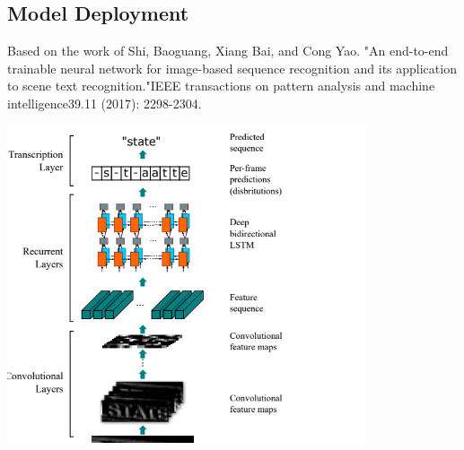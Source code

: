 \documentclass[14pt]{extarticle}
\newcommand{\<}{\langle}
\renewcommand{\>}{\rangle}
\theoremstyle{definition}
\begin{document}
\subsection{Model Deployment}
Based on the work of Shi, Baoguang, Xiang Bai, and Cong Yao. "An end-to-end trainable neural network for image-based sequence recognition and its application to scene text recognition."IEEE transactions on pattern analysis and machine intelligence39.11 (2017): 2298-2304.\cite{crnn}\cite{buildcrnn} \newline
\begin{center}
    \includegraphics[width=400]{crnn.png}
\end{center}
\end{document}
